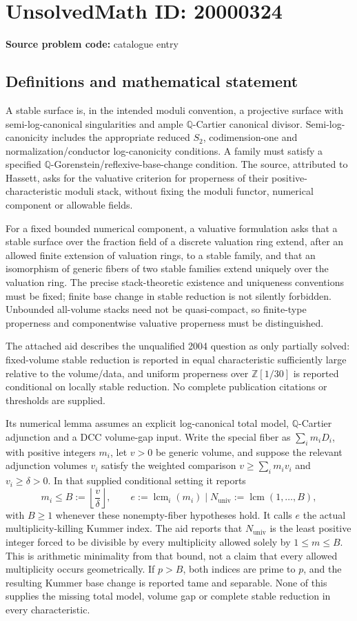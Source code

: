 \documentclass[11pt]{article}
\newcommand{\Z}{\mathbb{Z}}
\newcommand{\Q}{\mathbb{Q}}
\begin{document}
\section*{UnsolvedMath ID: 20000324}
\textbf{Source problem code:} catalogue entry
\subsection{Definitions and mathematical statement}
A stable surface is, in the intended moduli convention, a projective surface with semi-log-canonical singularities and ample \(\Q\)-Cartier canonical divisor. Semi-log-canonicity includes the appropriate reduced \(S_2\), codimension-one and normalization/conductor log-canonicity conditions. A family must satisfy a specified \(\Q\)-Gorenstein/reflexive-base-change condition. The source, attributed to Hassett, asks for the valuative criterion for properness of their positive-characteristic moduli stack, without fixing the moduli functor, numerical component or allowable fields.

For a fixed bounded numerical component, a valuative formulation asks that a stable surface over the fraction field of a discrete valuation ring extend, after an allowed finite extension of valuation rings, to a stable family, and that an isomorphism of generic fibers of two stable families extend uniquely over the valuation ring. The precise stack-theoretic existence and uniqueness conventions must be fixed; finite base change in stable reduction is not silently forbidden. Unbounded all-volume stacks need not be quasi-compact, so finite-type properness and componentwise valuative properness must be distinguished.

The attached aid describes the unqualified 2004 question as only partially solved: fixed-volume stable reduction is reported in equal characteristic sufficiently large relative to the volume/data, and uniform properness over \(\Z[1/30]\) is reported conditional on locally stable reduction. No complete publication citations or thresholds are supplied.

Its numerical lemma assumes an explicit log-canonical total model, \(\Q\)-Cartier adjunction and a DCC volume-gap input. Write the special fiber as \(\sum_i m_iD_i\), with positive integers \(m_i\), let \(v>0\) be generic volume, and suppose the relevant adjunction volumes \(v_i\) satisfy the weighted comparison \(v\geq\sum_i m_iv_i\) and \(v_i\geq\delta>0\). In that supplied conditional setting it reports
\[
m_i\leq B:=\left\lfloor\frac v\delta\right\rfloor,\qquad
e:=\operatorname{lcm}_i(m_i)\mid
N_{\mathrm{univ}}:=\operatorname{lcm}(1,\ldots,B),
\]
with \(B\geq1\) whenever these nonempty-fiber hypotheses hold. It calls \(e\) the actual multiplicity-killing Kummer index. The aid reports that \(N_{\mathrm{univ}}\) is the least positive integer forced to be divisible by every multiplicity allowed solely by \(1\leq m\leq B\). This is arithmetic minimality from that bound, not a claim that every allowed multiplicity occurs geometrically. If \(p>B\), both indices are prime to \(p\), and the resulting Kummer base change is reported tame and separable. None of this supplies the missing total model, volume gap or complete stable reduction in every characteristic.
\end{document}
